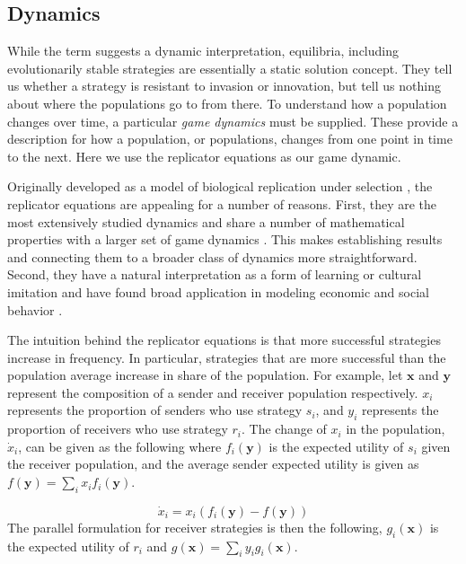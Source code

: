 \documentclass[12pt]{article}
\theoremstyle{definition} \newtheorem{definition}{Definition}
\begin{document}
\subsection{Dynamics}

While the term suggests a dynamic interpretation, equilibria, including evolutionarily stable strategies are essentially a static solution concept. They tell us whether a strategy is resistant to invasion or innovation, but tell us nothing about where the populations go to from there. To understand how a population changes over time, a particular \emph{game dynamics} must be supplied. These provide a  description for how a population, or populations, changes from one point in time to the next. Here we use the replicator equations as our game dynamic.

Originally developed as a model of biological replication under selection \citep{taylor-jonker:1978}, the replicator equations are appealing for a number of reasons. First, they are the most extensively studied dynamics and share a number of mathematical properties with a larger set of game dynamics \citep{hofbauer-sigmund:1998}.  This makes establishing results and connecting them to a broader class of dynamics more straightforward. Second, they have a natural interpretation as a form of learning or cultural imitation \citep{fudenberg-levine:1998} and have found broad application in modeling economic \citep{samuelson:1997, cressman:2003} and social behavior \citep{skyrms:1996,skyrms:2004,skyrms:2010}.

The intuition behind the replicator equations is that  more successful strategies increase in frequency. In particular, strategies that are more successful than the population average increase in share of the population. For example, let $\mathbf{x}$ and $\mathbf{y}$ represent the composition of a sender and receiver population respectively. $x_i$ represents the proportion of senders who use strategy $s_i$, and $y_i$ represents the proportion of receivers who use strategy $r_i$. The change of $x_i$ in the population, $\dot{x}_i$, can be given as the following where $f_i(\mathbf{y})$ is the expected utility of $s_i$ given the receiver population, and the average sender expected utility is given as $f(\mathbf{y}) = \sum_{i} x_if_i(\mathbf{y})$.

\begin{equation}
     \dot{x}_i = x_i(f_i(\mathbf{y}) - f(\mathbf{y}))
\end{equation}
The parallel formulation for receiver strategies is then the following, $g_i(\mathbf{x})$ is the expected utility of $r_i$ and $g(\mathbf{x}) = \sum_{i} y_ig_i(\mathbf{x})$.
\end{document}
